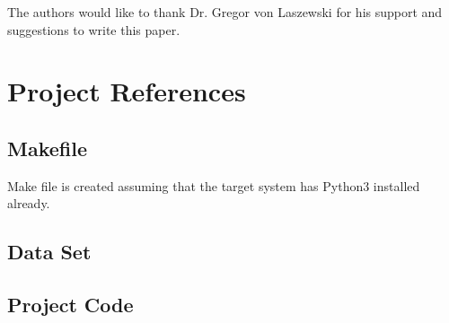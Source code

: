 \documentclass[sigconf]{acmart}
\begin{document}
\begin{acks}

  The authors would like to thank Dr. Gregor von Laszewski for his
  support and suggestions to write this paper.

\end{acks}


 

\appendix

\section{Project References}
\subsection{Makefile}\label{Makefile}

Make file is created assuming that the target system has Python3 installed already.

\subsection{Data Set}
\subsection{Project Code}
\end{document}
